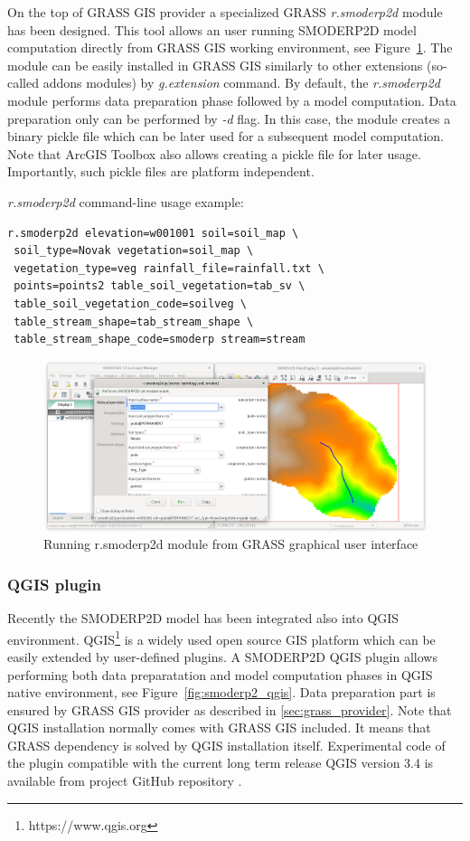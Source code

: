 On the top of GRASS GIS provider a specialized GRASS {\em r.smoderp2d}
module has been designed. This tool allows an user running SMODERP2D
model computation directly from GRASS GIS working environment, see
Figure~\ref{fig:r.smoderp2d}. The module can be easily installed in
GRASS GIS similarly to other extensions (so-called addons modules) by
{\em g.extension} command. By default, the {\em r.smoderp2d} module
performs data preparation phase followed by a model computation. Data
preparation only can be performed by {\em -d} flag. In this case, the
module creates a binary pickle file which can be later used for a
subsequent model computation. Note that ArcGIS Toolbox also allows
creating a pickle file for later usage. Importantly, such pickle files
are platform independent.

{\em r.smoderp2d} command-line usage example:
\begin{verbatim}
r.smoderp2d elevation=w001001 soil=soil_map \
 soil_type=Novak vegetation=soil_map \
 vegetation_type=veg rainfall_file=rainfall.txt \
 points=points2 table_soil_vegetation=tab_sv \
 table_soil_vegetation_code=soilveg \
 table_stream_shape=tab_stream_shape \
 table_stream_shape_code=smoderp stream=stream 
\end{verbatim}

\begin{figure}[ht!]
  \begin{center}
    \includegraphics[width=1.0\columnwidth]{figures/smoderp2d_grass.png}
    \caption{Running r.smoderp2d module from GRASS graphical user interface}
    \label{fig:r.smoderp2d}
  \end{center}
\end{figure}

\subsubsection{QGIS plugin}
Recently the SMODERP2D model has been integrated also into QGIS
environment. QGIS\footnote{https://www.qgis.org} is a widely used open
source GIS platform which can be easily extended by user-defined
plugins. A SMODERP2D QGIS plugin allows performing both data
preparatation and model computation phases in QGIS native environment,
see Figure~\ref{fig:smoderp2_qgis}. Data preparation part is ensured by
GRASS GIS provider as described in \ref{sec:grass_provider}. Note that
QGIS installation normally comes with GRASS GIS included. It means
that GRASS dependency is solved by QGIS installation
itself. Experimental code of the plugin compatible with the current
long term release QGIS version 3.4 is available from project GitHub
repository \cite{smoderp2d-github-2019}.

